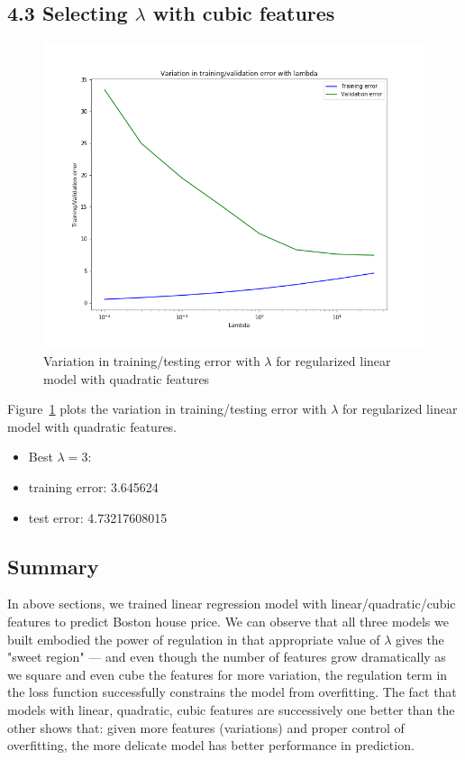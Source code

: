 \documentclass[english,11pt]{article}
\begin{document}
\subsection*{ 4.3 Selecting $\lambda$ with cubic features}
\begin{figure}[h]
\centering
\includegraphics[width=.5\textwidth]{../hw1/part2/fig4_cubic_lambda_3.png}
\caption{Variation in training/testing error with $\lambda$ for regularized linear model with quadratic features}
\label{fig:4_3}
\end{figure}

Figure~\ref{fig:4_3} plots the variation in training/testing error with $\lambda$ for regularized linear model with quadratic features. 
\begin{itemize}
\item Best $\lambda=3$:
\item training error:  3.645624
\item test error: 4.73217608015
\end{itemize}







\subsection*{ Summary}
In above sections, we trained linear regression model with linear/quadratic/cubic features to predict Boston house price. We can observe that all three models we built embodied the power of regulation in that appropriate value of $\lambda$ gives the "sweet region" --- and even though the number of features grow dramatically as we square and even cube the features for more variation, the regulation term in the loss function successfully constrains the model from overfitting. The fact that models with linear, quadratic, cubic features are successively one better than the other shows that: given more features (variations) and proper control of overfitting, the more delicate model has better performance in prediction.
\end{document}
